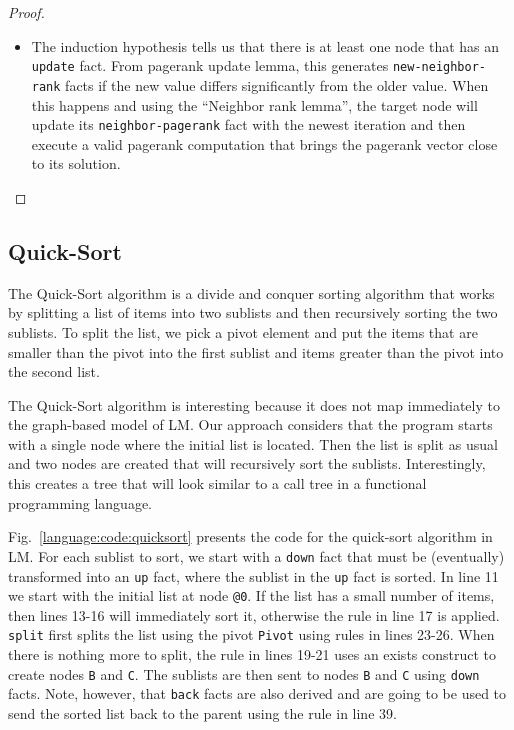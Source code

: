 \begin{proof}
\begin{itemize}
   \item The induction hypothesis tells us that there is at least one node that
   has an \texttt{update} fact. From pagerank update lemma, this
   generates \texttt{new-neighbor-rank} facts if the new value differs
   significantly from the older value. When this happens and using the ``Neighbor
   rank lemma'', the target node will update its \texttt{neighbor-pagerank} fact
   with the newest iteration and then execute a valid pagerank computation that
   brings the pagerank vector close to its solution.

\end{itemize}

\end{proof}


\subsection{Quick-Sort}

The Quick-Sort algorithm is a divide and conquer sorting algorithm that works by splitting
a list of items into two sublists and then recursively sorting the two sublists.
To split the list, we pick a pivot element and put the items that are smaller than the pivot
into the first sublist and items greater than the pivot into the second list.

The Quick-Sort algorithm is interesting because it does not map immediately to
the graph-based model of LM. Our approach considers that the program starts with
a single node where the initial list is located. Then the list is split as usual
and two nodes are created that will recursively sort the sublists.
Interestingly, this creates a tree that will look similar to a call tree in a
functional programming language.

Fig.~\ref{language:code:quicksort} presents the code for the quick-sort
algorithm in LM. For each sublist to sort, we start with a \texttt{down} fact
that must be (eventually) transformed into an \texttt{up} fact, where the
sublist in the \texttt{up} fact is sorted.  In line 11 we start with the initial
list at node \texttt{@0}. If the list has a small number of items, then lines
13-16 will immediately sort it, otherwise the rule in line 17 is applied.
\texttt{split} first splits the list using the pivot \texttt{Pivot} using rules
in lines 23-26.  When there is nothing more to split, the rule in lines 19-21
uses an exists construct to create nodes \texttt{B} and \texttt{C}. The sublists
are then sent to nodes \texttt{B} and \texttt{C} using \texttt{down} facts.
Note, however, that \texttt{back} facts are also derived and are going to be
used to send the sorted list back to the parent using the rule in line 39.

